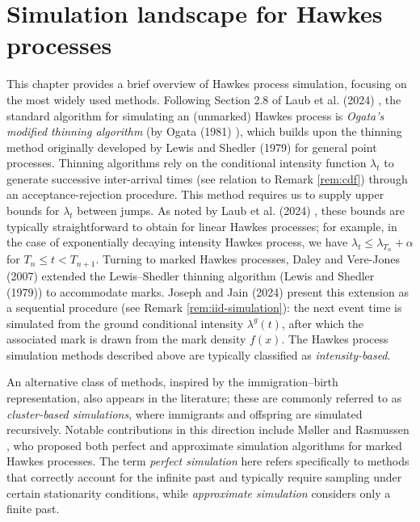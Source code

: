 \documentclass[12pt,a4paper]{report}
\theoremstyle{plain}
\theoremstyle{definition}
\theoremstyle{remark}
\newcommand{\1}{\mathbf{1}}
\begin{document}
\chapter{Simulation landscape for Hawkes processes}
\label{chap:6}
This chapter provides a brief overview of Hawkes process simulation, focusing on the most widely used methods. Following Section 2.8 of Laub et al. (2024) \cite{LLPT24}, the standard algorithm for simulating an (unmarked) Hawkes process is \textit{Ogata's modified thinning algorithm} (by Ogata (1981) \cite{Oga81}), which builds upon the thinning method originally developed by Lewis and Shedler (1979) \cite{LS79} for general point processes. Thinning algorithms rely on the conditional intensity function $\lambda_t$ to generate successive inter-arrival times (see relation to Remark \ref{rem:cdf}) through an acceptance-rejection procedure. This method requires us to supply upper bounds for $\lambda_t$ between jumps. As noted by Laub et al. (2024) \cite{LLPT24}, these bounds are typically straightforward to obtain for linear Hawkes processes; for example, in the case of exponentially decaying intensity Hawkes process, we have $\lambda_t \leq \lambda_{T_n} + \alpha$ for $T_n \leq t < T_{n+1}$. Turning to marked Hawkes processes, Daley and Vere-Jones (2007) \cite{DVJ07} extended the Lewis–Shedler thinning algorithm (Lewis and Shedler (1979)) to accommodate marks. Joseph and Jain (2024) \cite{JJ24} present this extension as a sequential procedure (see Remark \ref{rem:iid-simulation}): the next event time is simulated from the ground conditional intensity $\lambda^g(t)$, after which the associated mark is drawn from the mark density $f(x)$.
The Hawkes process simulation methods described above are typically classified as \emph{intensity-based}.

\medskip
\noindent
An alternative class of methods, inspired by the immigration–birth representation, also appears in the literature; these are commonly referred to as \emph{cluster-based simulations}, where immigrants and offspring are simulated recursively. Notable contributions in this direction include Møller and Rasmussen \cite{MR05, MR06}, who proposed both perfect and approximate simulation algorithms for marked Hawkes processes. The term \emph{perfect simulation} here refers specifically to methods that correctly account for the infinite past and typically require sampling under certain stationarity conditions, while \emph{approximate simulation} considers only a finite past.
\end{document}
